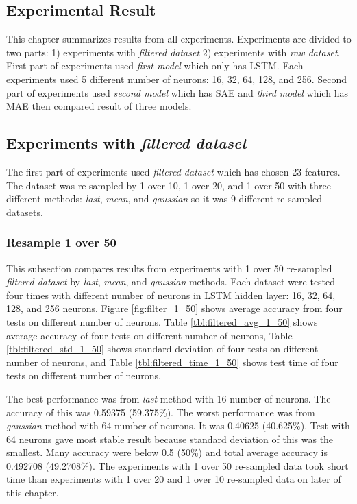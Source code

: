 \documentclass[draft,dvipsnames]{drexel-thesis}
\begin{document}
\begin{thesis}
\chapter{Experimental Result}\label{chap:result}
This chapter summarizes results from all experiments. Experiments are divided to two parts: 1) experiments with {\em filtered dataset} 2) experiments with {\em raw dataset}. First part of experiments used {\em first model} which only has LSTM. Each experiments used 5 different number of neurons: 16, 32, 64, 128, and 256. Second part of experiments used {\em second model} which has SAE and {\em third model} which has MAE then compared result of three models.

\section{Experiments with {\em filtered dataset}}
The first part of experiments used {\em filtered dataset} which has chosen 23 features. The dataset was re-sampled by 1 over 10, 1 over 20, and 1 over 50 with three different methods: {\em last}, {\em mean}, and {\em gaussian} so it was 9 different re-sampled datasets.

\subsection{Resample 1 over 50}
This subsection compares results from experiments with 1 over 50 re-sampled {\em filtered dataset} by {\em last}, {\em mean}, and {\em gaussian} methods. Each dataset were tested four times with different number of neurons in LSTM hidden layer: 16, 32, 64, 128, and 256 neurons. Figure \ref{fig:filter_1_50} shows average accuracy from four tests on different number of neurons. Table \ref{tbl:filtered_avg_1_50} shows average accuracy of four tests on different number of neurons, Table \ref{tbl:filtered_std_1_50} shows standard deviation of four tests on different number of neurons, and Table \ref{tbl:filtered_time_1_50} shows test time of four tests on different number of neurons.

The best performance was from {\em last} method with 16 number of neurons. The accuracy of this was 0.59375 (59.375\%). The worst performance was from {\em gaussian} method with 64 number of neurons. It was 0.40625 (40.625\%). Test with 64 neurons gave most stable result because standard deviation of this was the smallest. Many accuracy were below 0.5 (50\%) and total average accuracy is 0.492708 (49.2708\%). The experiments with 1 over 50 re-sampled data took short time than experiments with 1 over 20 and 1 over 10 re-sampled data on later of this chapter.


\end{thesis}
\end{document}
